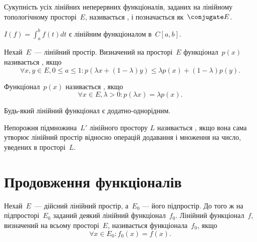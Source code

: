 \begin{definition}
Сукупність усіх лінійних неперервних
функціоналів, заданих на лінійному топологічному
просторі~$E$, називається , і
позначається як~$\conjugate E$.
\end{definition}

\begin{example}
$I(f) = \int_a^b f(t) dt$ є лінійним функціоналом в~$C[a, b]$.
\end{example}

\begin{definition}
Нехай~$E$~--- лінійний простір. Визначений на
просторі~$E$ функціонал~$p(x)$ називається , якщо
\begin{equation*}
    \forall x, y \in E, 0 \le a \le 1:
    p(\lambda x + (1 - \lambda) y) \le \lambda p(x) + (1 - \lambda) p(y).
\end{equation*}
\end{definition}

\begin{definition}
Функціонал~$p(x)$ називається , якщо
\begin{equation*}
    \forall x \in E, \lambda > 0: p(\lambda x) = \lambda p(x).
\end{equation*}
\end{definition}

\begin{example}
Будь-який лінійний функціонал є додатно-однорідним.
\end{example}

\begin{definition}
Непорожня підмножина~$L'$ лінійного простору
$L$ називається , якщо вона сама
утворює лінійний простір відносно операцій додавання і
множення на число, уведених в просторі~$L$.
\end{definition}

\section{Продовження функціоналів}

\begin{definition}
Нехай~$E$~--- дійсний лінійний простір, а~$E_0$ ---
його підпростір. До того ж на підпросторі~$E_0$ заданий
деякий лінійний функціонал~$f_0$. Лінійний функціонал~$f$,
визначений на всьому просторі~$E$, називається
 функціонала~$f_0$, якщо 
\begin{equation*}
    \forall x \in E_0: f_0(x) = f(x).
\end{equation*}
\end{definition}

